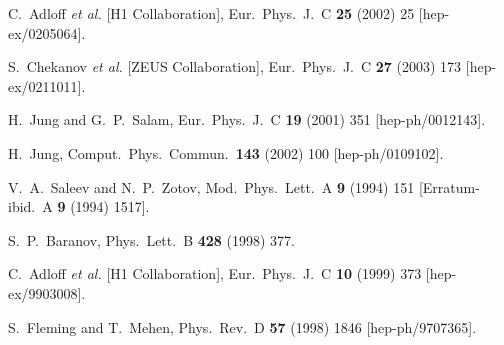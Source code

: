 \begin{thebibliography}{999}
C.~Adloff {\it et al.}  [H1 Collaboration],
Eur.\ Phys.\ J.\ C {\bf 25} (2002) 25
[hep-ex/0205064].


S.~Chekanov {\it et al.}  [ZEUS Collaboration],
Eur.\ Phys.\ J.\ C {\bf 27} (2003) 173
[hep-ex/0211011].


H.~Jung and G.~P.~Salam,
Eur.\ Phys.\ J.\ C {\bf 19} (2001) 351 
[hep-ph/0012143].

H.~Jung,
Comput.\ Phys.\ Commun.\  {\bf 143} (2002) 100
[hep-ph/0109102].

V.~A.~Saleev and N.~P.~Zotov,
Mod.\ Phys.\ Lett.\ A {\bf 9} (1994) 151
[Erratum-ibid.\ A {\bf 9} (1994) 1517].

S.~P.~Baranov,
Phys.\ Lett.\ B {\bf 428} (1998) 377.


C.~Adloff {\it et al.}  [H1 Collaboration],
Eur.\ Phys.\ J.\ C {\bf 10} (1999) 373 
[hep-ex/9903008].

S.~Fleming and T.~Mehen,
Phys.\ Rev.\ D {\bf 57} (1998) 1846
[hep-ph/9707365].


\end{thebibliography}
